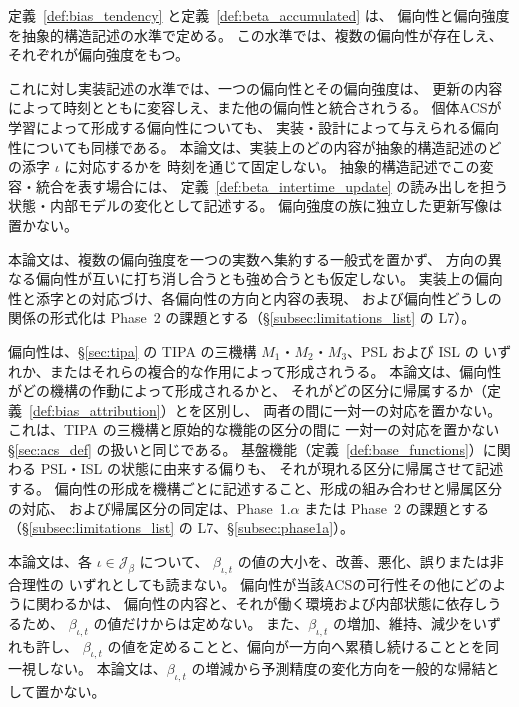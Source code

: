 \begin{remark}[偏向性の抽象的構造記述と実装記述の区別]
\label{rem:beta_multiple_biases}
定義~\ref{def:bias_tendency} と定義~\ref{def:beta_accumulated} は、
偏向性と偏向強度を抽象的構造記述の水準で定める。
この水準では、複数の偏向性が存在しえ、それぞれが偏向強度をもつ。

これに対し実装記述の水準では、一つの偏向性とその偏向強度は、
更新の内容によって時刻とともに変容しえ、また他の偏向性と統合されうる。
個体ACSが学習によって形成する偏向性についても、
実装・設計によって与えられる偏向性についても同様である。
本論文は、実装上のどの内容が抽象的構造記述のどの添字 $\iota$ に対応するかを
時刻を通じて固定しない。
抽象的構造記述でこの変容・統合を表す場合には、
定義~\ref{def:beta_intertime_update} の読み出しを担う状態・内部モデルの変化として記述する。
偏向強度の族に独立した更新写像は置かない。

本論文は、複数の偏向強度を一つの実数へ集約する一般式を置かず、
方向の異なる偏向性が互いに打ち消し合うとも強め合うとも仮定しない。
実装上の偏向性と添字との対応づけ、各偏向性の方向と内容の表現、
および偏向性どうしの関係の形式化は Phase~2 の課題とする（\S\ref{subsec:limitations_list} の L7）。
\end{remark}

\begin{remark}[偏向性の形成と帰属の区別]
\label{rem:bias_formation_vs_attribution}
偏向性は、\S\ref{sec:tipa} の TIPA の三機構 $M_1$・$M_2$・$M_3$、PSL および ISL の
いずれか、またはそれらの複合的な作用によって形成されうる。
本論文は、偏向性がどの機構の作動によって形成されるかと、
それがどの区分に帰属するか（定義~\ref{def:bias_attribution}）とを区別し、
両者の間に一対一の対応を置かない。
これは、TIPA の三機構と原始的な機能の区分の間に
一対一の対応を置かない \S\ref{sec:acs_def} の扱いと同じである。
基盤機能（定義~\ref{def:base_functions}）に関わる PSL・ISL の状態に由来する偏りも、
それが現れる区分に帰属させて記述する。
偏向性の形成を機構ごとに記述すること、形成の組み合わせと帰属区分の対応、
および帰属区分の同定は、Phase~1.$\alpha$ または Phase~2 の課題とする
（\S\ref{subsec:limitations_list} の L7、\S\ref{subsec:phase1a}）。
\end{remark}

\begin{remark}[偏向強度の値と良否の区別]
\label{rem:beta_value_not_quality}
本論文は、各 $\iota\in\mathcal J_{\beta}$ について、
$\beta_{\iota,t}$ の値の大小を、改善、悪化、誤りまたは非合理性の
いずれとしても読まない。
偏向性が当該ACSの可行性その他にどのように関わるかは、
偏向性の内容と、それが働く環境および内部状態に依存しうるため、
$\beta_{\iota,t}$ の値だけからは定めない。
また、$\beta_{\iota,t}$ の増加、維持、減少をいずれも許し、
$\beta_{\iota,t}$ の値を定めることと、偏向が一方向へ累積し続けることとを同一視しない。
本論文は、$\beta_{\iota,t}$ の増減から予測精度の変化方向を一般的な帰結として置かない。
\end{remark}

